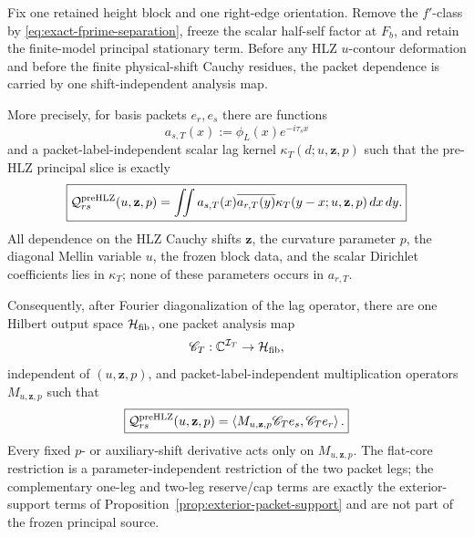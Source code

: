 \begin{lemma}
\label{lem:pre-HLZ-packet-separation}
Fix one retained height block and one right-edge orientation.  Remove the
$f'$-class by \eqref{eq:exact-fprime-separation}, freeze the scalar half-self
factor at $F_b$, and retain the finite-model principal stationary term.  Before
any HLZ $u$-contour deformation and before the finite physical-shift Cauchy
residues, the packet dependence is carried by one shift-independent analysis
map.

More precisely, for basis packets $e_r,e_s$ there are functions
\[
a_{s,T}(x):=\phi_L(x)e^{-i\tau_sx}
\]
and a packet-label-independent scalar lag kernel
$\kappa_T(d;u,\mathbf z,p)$ such that the pre-HLZ principal slice is exactly
\begin{equation}
\boxed{
\mathcal Q_{rs}^{\rm preHLZ}(u,\mathbf z,p)
 =\iint a_{s,T}(x)\overline{a_{r,T}(y)}
 \kappa_T(y-x;u,\mathbf z,p)\,dx\,dy .
}
\label{eq:pre-HLZ-lag-factorization}
\end{equation}
All dependence on the HLZ Cauchy shifts $\mathbf z$, the curvature parameter
$p$, the diagonal Mellin variable $u$, the frozen block data, and the scalar
Dirichlet coefficients lies in $\kappa_T$; none of these parameters occurs in
$a_{r,T}$.

Consequently, after Fourier diagonalization of the lag operator, there are one
Hilbert output space $\mathcal H_{\rm fib}$, one packet analysis map
\[
\mathscr C_T:\mathbb C^{\mathcal I_T}\to\mathcal H_{\rm fib},
\]
independent of $(u,\mathbf z,p)$, and packet-label-independent multiplication
operators $M_{u,\mathbf z,p}$ such that
\begin{equation}
\boxed{
\mathcal Q_{rs}^{\rm preHLZ}(u,\mathbf z,p)
 =\left\langle M_{u,\mathbf z,p}\mathscr C_Te_s,
 \mathscr C_Te_r\right\rangle .
}
\label{eq:pre-HLZ-common-output}
\end{equation}
Every fixed $p$- or auxiliary-shift derivative acts only on
$M_{u,\mathbf z,p}$.  The flat-core restriction is a parameter-independent
restriction of the two packet legs; the complementary one-leg and two-leg
reserve/cap terms are exactly the exterior-support terms of
Proposition~\ref{prop:exterior-packet-support} and are not part of the frozen
principal source.
\end{lemma}

